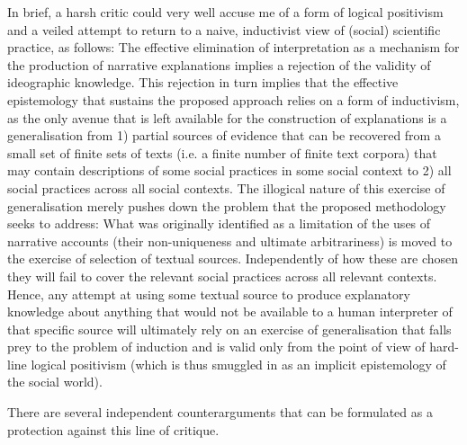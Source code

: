 In brief, a harsh critic could very well accuse me of a form of logical positivism and a veiled attempt to return to a naive, inductivist view of (social) scientific practice, as follows:
The effective elimination of interpretation as a mechanism for the production of narrative explanations implies a rejection of the validity of ideographic knowledge.
This rejection in turn implies that the effective epistemology that sustains the proposed approach relies on a form of inductivism, as the only avenue that is left available for the construction of explanations is a generalisation from 1) partial sources of evidence that can be recovered from a small set of finite sets of texts (i.e. a finite number of finite text corpora) that may contain descriptions of some social practices in some social context to 2) all social practices across all social contexts.
The illogical nature of this exercise of generalisation merely pushes down the problem that the proposed methodology seeks to address:
What was originally identified as a limitation of the uses of narrative accounts (their non-uniqueness and ultimate arbitrariness) is moved to the exercise of selection of textual sources.
Independently of how these are chosen they will fail to cover the relevant social practices across all relevant contexts.
Hence, any attempt at using some textual source to produce explanatory knowledge about anything that would not be available to a human interpreter of that specific source will ultimately rely on an exercise of generalisation that falls prey to the problem of induction and is valid only from the point of view of hard-line logical positivism (which is thus smuggled in as an implicit epistemology of the social world).

There are several independent counterarguments that can be formulated as a protection against this line of critique.

